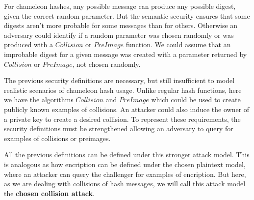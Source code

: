 \documentclass[a4paper]{article}
\begin{document}
 For chameleon hashes, any possible message can produce any possible
 digest, given the correct random parameter. But the semantic security
 ensures that some digests aren't more probable for some messages than
 for others. Otherwise an adversary could identify if a random 
 parameter was chosen randomly or was produced with a $Collision$ or
 $PreImage$ function. We could assume that an improbable digest for a
 given message was created with a parameter returned by $Collision$
 or $PreImage$, not chosen randomly.
 
 The previous security definitions are necessary, but still 
 insufficient to model realistic scenarios of chameleon hash usage. 
 Unlike regular hash functions, here we have the algorithms
 $Collision$ and $PreImage$ which could be used to create
 publicly known examples of collisions. An attacker could also
 induce the owner of a private key to create a desired
 collision. To represent these requirements, the security definitions
 must be strengthened allowing an adversary to query for examples
 of collisions or preimages.
 
 All the previous definitions can be defined under this stronger attack model. This is analogous as how encription can be defined under the chosen plaintext model, where an attacker can query the challenger for examples of encription. But here, as we are dealing with collisions of hash messages, we will call this attack model the \textbf{chosen collision attack}.
 
\end{document}
